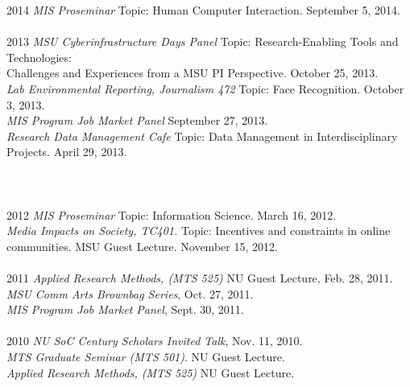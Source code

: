 \documentclass[9pt]{extarticle}
\begin{document}
\begin{tabbing}
2014 \hspace{0.3in}\=  \emph{MIS Proseminar} Topic: Human Computer Interaction. September 5, 2014.\\\\ 

2013 \hspace{0.3in}\=  \emph{MSU Cyberinfrastructure Days Panel} Topic: Research-Enabling Tools and Technologies:\\
\> \hspace{0.5cm} Challenges and Experiences from a MSU PI Perspective. October 25, 2013.\\ 
\> \emph{Lab Environmental Reporting, Journalism 472} Topic: Face Recognition. October 3, 2013. \\
\> \emph{MIS Program Job Market Panel} September 27, 2013. \\
\> \emph{Research Data Management Cafe} Topic: Data Management in Interdisciplinary \\
\> \hspace{0.5cm} Projects. April 29, 2013. \\\\\\\\ %

2012 \hspace{0.3in}\=  \emph{MIS Proseminar} Topic: Information Science. March 16, 2012.\\
\> \emph{Media Impacts on Society, TC401.} Topic: Incentives and constraints in online \\
\> \hspace{0.5cm} communities. MSU Guest Lecture. November 15, 2012. \\\\

2011 \hspace{0.3in}\= \emph{Applied Research Methods, (MTS 525)} NU Guest Lecture, Feb. 28, 2011. \\
\> \emph{MSU Comm Arts Brownbag Series}, Oct. 27, 2011. \\
\> \emph{MIS Program Job Market Panel}, Sept. 30, 2011. \\\\

2010 \hspace{0.3in}\= \emph{NU SoC Century Scholars Invited Talk}, Nov. 11, 2010. \\
\> \emph{MTS Graduate Seminar (MTS 501)}. NU Guest Lecture. \\
\> \emph{Applied Research Methods, (MTS 525)} NU Guest Lecture. \\\\


\end{tabbing}
\end{document}
